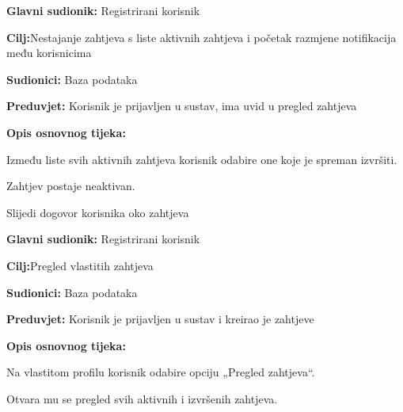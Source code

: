\noindent {}
\begin{packed_item}
	\item \textbf{Glavni sudionik: }Registrirani korisnik
	\item  \textbf{Cilj:}Nestajanje zahtjeva s liste aktivnih zahtjeva i početak razmjene notifikacija među korisnicima 
	\item  \textbf{Sudionici:} Baza podataka
	\item  \textbf{Preduvjet:} Korisnik je prijavljen u sustav, ima uvid u pregled zahtjeva
	\item  \textbf{Opis osnovnog tijeka:}
	
	\item[] \begin{packed_enum}
		
		\item Između liste svih aktivnih zahtjeva korisnik odabire one koje je spreman izvršiti.
		\item Zahtjev postaje neaktivan.
		\item 	Slijedi dogovor korisnika oko zahtjeva
	\end{packed_enum}
	
\end{packed_item}

\noindent {}
\begin{packed_item}
	\item \textbf{Glavni sudionik: }Registrirani korisnik
	\item  \textbf{Cilj:}Pregled vlastitih zahtjeva
	\item  \textbf{Sudionici:} Baza podataka
	\item  \textbf{Preduvjet:} Korisnik je prijavljen u sustav i kreirao je zahtjeve
	\item  \textbf{Opis osnovnog tijeka:}
	
	\item[] \begin{packed_enum}
		
		\item Na vlastitom profilu korisnik odabire opciju „Pregled zahtjeva“.
		\item 	Otvara mu se pregled svih aktivnih i izvršenih zahtjeva.
	\end{packed_enum}
	
\end{packed_item}

